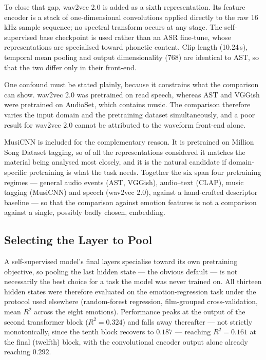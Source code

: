 To close that gap, wav2vec 2.0 \citep{baevski2020wav2vec} is added as a sixth
representation. Its feature encoder is a stack of one-dimensional convolutions applied
directly to the raw 16\,kHz sample sequence; no spectral transform occurs at any stage.
The self-supervised base checkpoint is used rather than an ASR fine-tune, whose
representations are specialised toward phonetic content. Clip length
(10.24\,s), temporal mean pooling and output dimensionality (768) are identical to AST, so
that the two differ only in their front-end.

One confound must be stated plainly, because it constrains what the comparison can show.
wav2vec 2.0 was pretrained on read speech, whereas AST and VGGish were pretrained on
AudioSet, which contains music. The comparison therefore varies the input domain and the
pretraining dataset simultaneously, and a poor result for wav2vec 2.0 cannot be attributed
to the waveform front-end alone.

MusiCNN \citep{pons2019musicnn} is included for the complementary reason. It is pretrained
on Million Song Dataset tagging, so of all the representations considered it matches the
material being analysed most closely, and it is the natural candidate if domain-specific
pretraining is what the task needs. Together the six span four pretraining regimes ---
general audio events (AST, VGGish), audio--text (CLAP), music tagging (MusiCNN) and speech
(wav2vec 2.0), against a hand-crafted descriptor baseline --- so that the comparison
against emotion features is not a comparison against a single, possibly badly chosen,
embedding.

\subsection{Selecting the Layer to Pool}

A self-supervised model's final layers specialise toward its own pretraining objective, so
pooling the last hidden state --- the obvious default --- is not necessarily the best
choice for a task the model was never trained on. All thirteen hidden states were
therefore evaluated on the emotion-regression task under the protocol used elsewhere
(random-forest regression, film-grouped cross-validation, mean $R^2$ across the eight
emotions). Performance peaks at the output of the second transformer block
($R^2 = 0.324$) and falls away thereafter --- not strictly monotonically, since the tenth
block recovers to $0.187$ --- reaching $R^2 = 0.161$ at the final (twelfth) block, with
the convolutional encoder output alone already reaching $0.292$.

